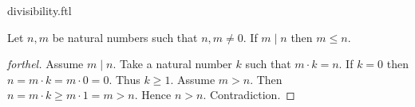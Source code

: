 \documentclass{naproche-library}
\begin{document}
\begin{smodule}{divisibility.ftl}
  \begin{proposition}[forthel,id=ARITHMETIC_07_2187144577679360]
    Let $n, m$ be natural numbers such that $n, m \neq 0$.
    If $m \mid n$ then $m \leq n$.
  \end{proposition}
  \begin{proof}[forthel]
    Assume $m \mid n$.
    Take a natural number $k$ such that $m \cdot k = n$.
    If $k = 0$ then
    $n
      = m \cdot k
      = m \cdot 0
      = 0$.
    Thus $k \geq 1$.
    Assume $m > n$.
    Then $n
      = m \cdot k
      \geq m \cdot 1
      = m
      > n$.
    Hence $n > n$.
    Contradiction.
  \end{proof}
\end{smodule}
\end{document}
